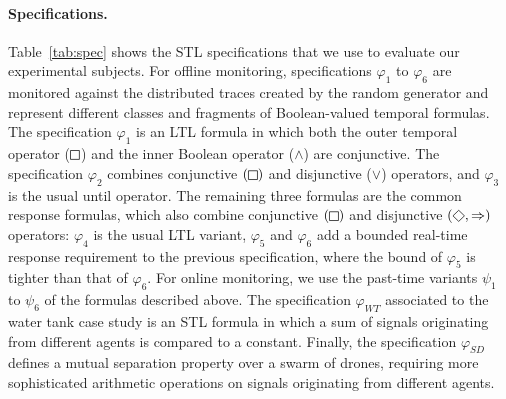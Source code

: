 \documentclass[iicol,lineno]{sn-jnl}
\renewcommand{\LTLf}{\LTLdiamond}
\renewcommand{\LTLg}{\LTLsquare}
\def\until{\kern.1em\mathcal{U}}
\newcommand{\?}{\text{?}}
\begin{document}
	\paragraph*{Specifications.}
	Table~\ref{tab:spec} shows the STL specifications that we use to evaluate our experimental subjects.
	For offline monitoring, specifications $\varphi_{1}$ to $\varphi_{6}$ are monitored against the distributed traces created by the random generator and represent different classes and fragments of Boolean-valued temporal formulas.
	The specification $\varphi_1$ is an LTL formula in which both the outer temporal operator ($\LTLg$) and the inner Boolean operator ($\wedge$) are conjunctive.
	The specification $\varphi_2$ combines conjunctive $(\LTLg)$ and disjunctive ($\lor$) operators, and $\varphi_3$ is the usual until operator.
	The remaining three formulas are the common response formulas, which also combine conjunctive $(\LTLg)$ and disjunctive $(\LTLf, \Rightarrow)$ operators: $\varphi_4$ is the usual LTL variant, $\varphi_5$ and $\varphi_6$ add a bounded real-time response requirement to the previous specification, where the bound of $\varphi_5$ is tighter than that of $\varphi_6$.
	For online monitoring, we use the past-time variants $\psi_1$ to $\psi_6$ of the formulas described above.
	The specification $\varphi_{WT}$ associated to the water tank case study is an STL formula in which a sum of signals originating from different agents is compared to a constant. Finally, the specification $\varphi_{SD}$ defines a mutual separation property over a swarm of drones, requiring more sophisticated arithmetic operations on signals originating from different agents.
	
		
\end{document}
